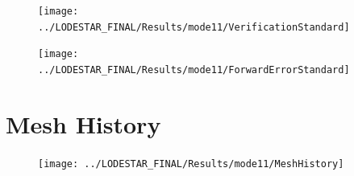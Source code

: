 		\begin{figure}
			\centering
			\texttt{[image: ../LODESTAR\_FINAL/Results/mode11/VerificationStandard]}
			\caption{}
			\label{fig:VerificationStandard}
		\end{figure}
		
		\begin{figure}
			\centering
			\texttt{[image: ../LODESTAR\_FINAL/Results/mode11/ForwardErrorStandard]}
			\caption{}
			\label{fig:ForwardErrorStandard}
		\end{figure}
		
		\section{Mesh History}
		
		
\begin{figure}[th]
\centering
\texttt{[image: ../LODESTAR\_FINAL/Results/mode11/MeshHistory]}
\caption{}
\label{fig:MeshHistory}
\end{figure}
		
